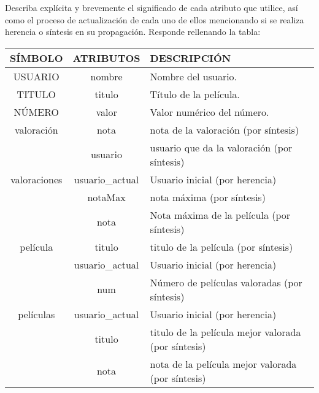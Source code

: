 \documentclass[nochap]{apuntes}
\begin{document}
\begin{problem}
Describa explícita y brevemente el significado de cada atributo que utilice, así como el proceso de actualización de cada uno de ellos mencionando si se realiza herencia o síntesis en su propagación. Responde rellenando la tabla:
\solution
\begin{tabular}{|c|c|l|}
\hline
SÍMBOLO & ATRIBUTOS & DESCRIPCIÓN \\
\hline
\hline
USUARIO & nombre & Nombre del usuario.\\
\hline
TITULO & titulo & Título de la película.\\
\hline
NÚMERO & valor & Valor numérico del número.\\
\hline
valoración & nota & nota de la valoración (por síntesis) \\
\cline{2-3}
& usuario & usuario que da la valoración (por síntesis)\\
\hline
valoraciones & usuario\_actual & Usuario inicial (por herencia)\\
\cline{2-3}
& notaMax & nota máxima (por síntesis) \\
\hline
& nota & Nota máxima de la película (por síntesis)\\
\cline{2-3}
película & titulo & titulo de la película (por síntesis) \\
\cline{2-3}
& usuario\_actual & Usuario inicial (por herencia) \\
\hline
& num & Número de películas valoradas (por síntesis)\\
\cline{2-3}
películas & usuario\_actual & Usuario inicial (por herencia) \\
\cline{2-3}
& titulo & titulo de la película mejor valorada (por síntesis) \\
\cline{2-3}
& nota & nota de la película mejor valorada (por síntesis)\\
\hline
\end{tabular}
\end{problem}
\end{document}
